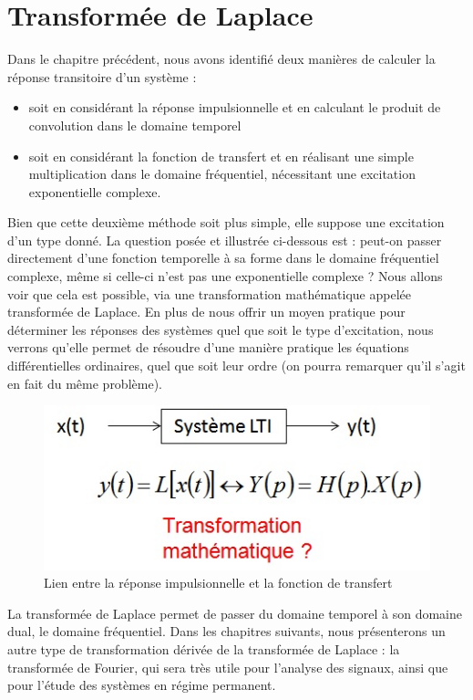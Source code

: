 	
\chapter{Transformée de Laplace}	
	
	Dans le chapitre précédent, nous avons identifié deux manières de calculer la réponse transitoire d'un système :
	\begin{itemize}
		\item soit en considérant la réponse impulsionnelle et en calculant le produit de convolution dans le domaine temporel
		\item soit en considérant la fonction de transfert et en réalisant une simple multiplication dans le domaine fréquentiel, nécessitant une excitation exponentielle complexe.\\
	\end{itemize}

	Bien que cette deuxième méthode soit plus simple, elle suppose une excitation d'un type donné. La question posée et illustrée ci-dessous est : peut-on passer directement d'une fonction temporelle à sa forme dans le domaine fréquentiel complexe, même si celle-ci n'est pas une exponentielle complexe ? Nous allons voir que cela est possible, via une transformation mathématique appelée transformée de Laplace. En plus de nous offrir un moyen pratique pour déterminer les réponses des systèmes quel que soit le type d'excitation, nous verrons  qu'elle permet de résoudre d'une manière pratique les équations différentielles ordinaires, quel que soit leur ordre (on pourra remarquer qu'il s'agit en fait du même problème). 
	
	\begin{figure}[h!]
		\centering
		\includegraphics[scale=0.5]{images/Position_Pb_Laplace.jpg}
		\caption{Lien entre la réponse impulsionnelle et la fonction de transfert}	
		\label{Fig:Position_Pb_Laplace} 
	\end{figure}
	
	 La transformée de Laplace permet de passer du domaine temporel à son domaine dual, le domaine fréquentiel. Dans les chapitres suivants, nous présenterons un autre type de transformation dérivée de la transformée de Laplace : la transformée de Fourier, qui sera très utile pour l'analyse des signaux, ainsi que pour l'étude des systèmes en régime permanent.
	
